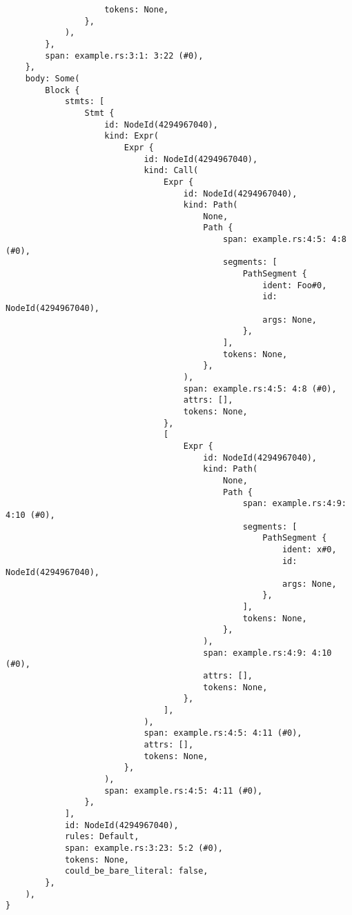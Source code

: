 \documentclass[
  11pt,
]{report}
\begin{document}
\begin{verbatim}
                    tokens: None,
                },
            ),
        },
        span: example.rs:3:1: 3:22 (#0),
    },
    body: Some(
        Block {
            stmts: [
                Stmt {
                    id: NodeId(4294967040),
                    kind: Expr(
                        Expr {
                            id: NodeId(4294967040),
                            kind: Call(
                                Expr {
                                    id: NodeId(4294967040),
                                    kind: Path(
                                        None,
                                        Path {
                                            span: example.rs:4:5: 4:8 (#0),
                                            segments: [
                                                PathSegment {
                                                    ident: Foo#0,
                                                    id: NodeId(4294967040),
                                                    args: None,
                                                },
                                            ],
                                            tokens: None,
                                        },
                                    ),
                                    span: example.rs:4:5: 4:8 (#0),
                                    attrs: [],
                                    tokens: None,
                                },
                                [
                                    Expr {
                                        id: NodeId(4294967040),
                                        kind: Path(
                                            None,
                                            Path {
                                                span: example.rs:4:9: 4:10 (#0),
                                                segments: [
                                                    PathSegment {
                                                        ident: x#0,
                                                        id: NodeId(4294967040),
                                                        args: None,
                                                    },
                                                ],
                                                tokens: None,
                                            },
                                        ),
                                        span: example.rs:4:9: 4:10 (#0),
                                        attrs: [],
                                        tokens: None,
                                    },
                                ],
                            ),
                            span: example.rs:4:5: 4:11 (#0),
                            attrs: [],
                            tokens: None,
                        },
                    ),
                    span: example.rs:4:5: 4:11 (#0),
                },
            ],
            id: NodeId(4294967040),
            rules: Default,
            span: example.rs:3:23: 5:2 (#0),
            tokens: None,
            could_be_bare_literal: false,
        },
    ),
}
\end{verbatim}
\end{document}
